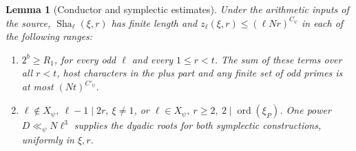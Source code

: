 \documentclass[letterpaper,11pt]{article}
\newtheorem{countlemma}{Lemma}[section]
\newcommand{\Sha}{\operatorname{Sha}}
\newcommand{\ord}{\operatorname{ord}}
\begin{document}
\begin{countlemma}[Conductor and symplectic estimates]\label{lem:symplectic}
Under the arithmetic inputs of the source, \(\Sha_\ell(\xi,r)\) has finite length and \(z_\ell(\xi,r)\le(\ell Nr)^{C_\psi}\) in each of the following ranges:
\begin{enumerate}
\item \(2^b\ge R_1\), for every odd \(\ell\) and every \(1\le r<t\). The sum of these terms over all \(r<t\), host characters in the plus part and any finite set of odd primes is at most \((Nt)^{C'_\psi}\).
\item \(\ell\notin X_\psi,\ \ell-1\mid 2r,\ \xi\ne1\), or \(\ell\in X_\psi,\ r\ge2,\ 2\mid\ord(\xi_P)\). One power \(D\ll_\psi N\ell^3\) supplies the dyadic roots for both symplectic constructions, uniformly in \(\xi,r\).
\end{enumerate}
\end{countlemma}
\end{document}
